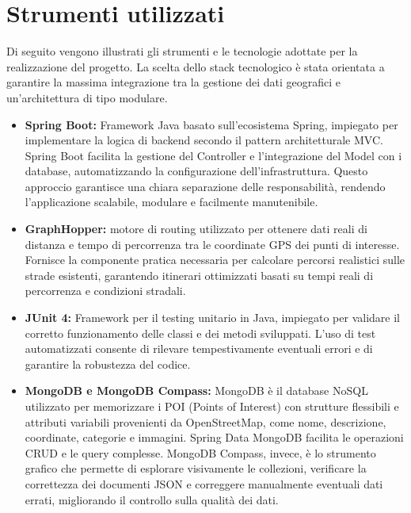 \section{Strumenti utilizzati}

Di seguito vengono illustrati gli strumenti e le tecnologie adottate per la realizzazione
del progetto. La scelta dello stack tecnologico è stata orientata a garantire la massima
integrazione tra la gestione dei dati geografici e un’architettura di tipo modulare.

\begin{itemize}

\item \textbf{Spring Boot:} Framework Java basato sull’ecosistema Spring, impiegato per implementare
la logica di backend secondo il pattern architetturale MVC. Spring Boot
facilita la gestione del Controller e l’integrazione del Model con i database, automatizzando
la configurazione dell’infrastruttura. Questo approccio garantisce una
chiara separazione delle responsabilità, rendendo l’applicazione scalabile, modulare
e facilmente manutenibile.

\item \textbf{GraphHopper:} motore di routing utilizzato per ottenere dati reali di distanza e
tempo di percorrenza tra le coordinate GPS dei punti di interesse. Fornisce la
componente pratica necessaria per calcolare percorsi realistici sulle strade esistenti,
garantendo itinerari ottimizzati basati su tempi reali di percorrenza e condizioni
stradali.

\item \textbf{JUnit 4:} Framework per il testing unitario in Java, impiegato per validare il corretto
funzionamento delle classi e dei metodi sviluppati. L’uso di test automatizzati
consente di rilevare tempestivamente eventuali errori e di garantire la robustezza del
codice.

\item \textbf{MongoDB e MongoDB Compass:} MongoDB è il database NoSQL utilizzato per
memorizzare i POI (Points of Interest) con strutture flessibili e attributi variabili
provenienti da OpenStreetMap, come nome, descrizione, coordinate, categorie e
immagini. Spring Data MongoDB facilita le operazioni CRUD e le query complesse.
MongoDB Compass, invece, è lo strumento grafico che permette di esplorare
visivamente le collezioni, verificare la correttezza dei documenti JSON e correggere
manualmente eventuali dati errati, migliorando il controllo sulla qualità dei dati.


\end{itemize}

